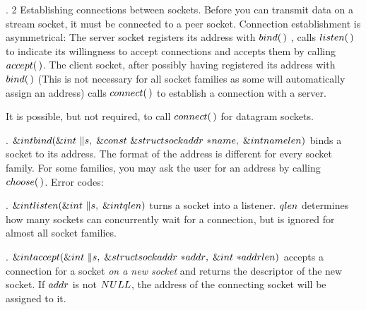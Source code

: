 \fi

. 2 Establishing connections between sockets. Before you can transmit data
on a
stream socket, it must be connected to a peer socket. Connection establishment
is
asymmetrical: The server socket registers its address with \CD{}$\\{bind}(\,)$%
\DC{}, calls \CD{}$\\{listen}(\,)$\DC{}
to indicate its willingness to accept connections and accepts them by calling
\CD{}$\\{accept}(\,)$\DC{}. The client socket, after possibly having registered
its address with
\CD{}$\\{bind}(\,)$\DC{} (This is not necessary for all socket families as some
will automatically
assign an address) calls \CD{}$\\{connect}(\,)$\DC{} to establish a connection
with a server.

It is possible, but not required, to call \CD{}$\\{connect}(\,)$\DC{} for
datagram sockets.

\fi

. \CD{}$\&{int}\ \\{bind}(\&{int}\ \|s,\;\&{const}\ \&{struct}\ %
\\{sockaddr}\ {*}\\{name},\;\&{int}\ \\{namelen})$\DC{} binds a socket to its
address. The
format of the address is different for every socket family. For some families,
you
may ask the user for an address by calling \CD{}$\\{choose}(\,)$\DC{}.
\medskip
Error codes:
\medskip{}

\fi

. \CD{}$\&{int}\ \\{listen}(\&{int}\ \|s,\;\&{int}\ \\{qlen})$\DC{} turns a
socket into a listener. \CD{}$\\{qlen}$\DC{} determines
how many sockets can concurrently wait for a connection, but is ignored for
almost
all socket families.

\fi

. \CD{}$\&{int}\ \\{accept}(\&{int}\ \|s,\;\&{struct}\ \\{sockaddr}\ {*}%
\\{addr},\;\&{int}\ {*}\\{addrlen})$\DC{} accepts a connection for a socket
{\it on a new socket} and returns the descriptor of the new socket. If \CD{}$%
\\{addr}$\DC{} is not
\CD{}$\\{NULL}$\DC{}, the address of the connecting socket will be assigned to
it.

